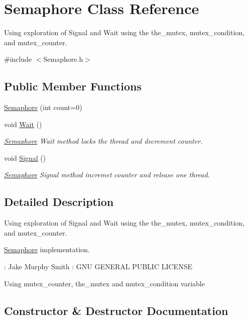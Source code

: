 \hypertarget{class_semaphore}{}\section{Semaphore Class Reference}
\label{class_semaphore}


Using exploration of Signal and Wait using the  the\+\_\+mutex, mutex\+\_\+condition, and mutex\+\_\+counter.  




{\ttfamily \#include $<$Semaphore.\+h$>$}

\subsection*{Public Member Functions}
\begin{DoxyCompactItemize}
\item 
\hyperlink{class_semaphore_aca1661adbce12634d2fa9d7e0c09d121}{Semaphore} (int count=0)
\item 
void \hyperlink{class_semaphore_a72aabebf026e3a8b1f3e4d0fa8ee1eda}{Wait} ()
\begin{DoxyCompactList}\small\item\em \hyperlink{class_semaphore}{Semaphore} Wait method locks the thread and decrement counter. \end{DoxyCompactList}\item 
void \hyperlink{class_semaphore_a86f92f738b4486439b296d8e235895f2}{Signal} ()
\begin{DoxyCompactList}\small\item\em \hyperlink{class_semaphore}{Semaphore} Signal method incremet counter and release one thread. \end{DoxyCompactList}\end{DoxyCompactItemize}


\subsection{Detailed Description}
Using exploration of Signal and Wait using the  the\+\_\+mutex, mutex\+\_\+condition, and mutex\+\_\+counter. 

\hyperlink{class_semaphore}{Semaphore} implementation.

\+: Jake Murphy Smith \+: G\+NU G\+E\+N\+E\+R\+AL P\+U\+B\+L\+IC L\+I\+C\+E\+N\+SE

Using mutex\+\_\+counter, the\+\_\+mutex and mutex\+\_\+condition variable 

\subsection{Constructor \& Destructor Documentation}
